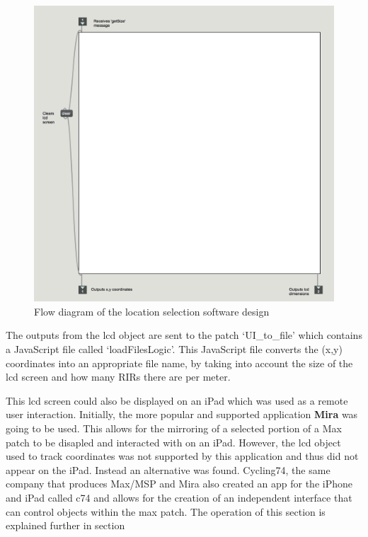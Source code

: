 \documentclass[../../main.tex]{subfiles}
\begin{document}
			\begin{figure}[H]
				\centerline{\includegraphics[scale = 0.4]{Sections/Implementation/Max/images/Max/lcd.png}}
				\caption{Flow diagram of the location selection software design}
				\label{lcd}
			\end{figure}

			The outputs from the lcd object are sent to the patch ‘UI\_to\_file’ which contains a JavaScript file called ‘loadFilesLogic’. This JavaScript file converts the (x,y) coordinates into an appropriate file name, by taking into account the size of the lcd screen and how many RIRs there are per meter.

			This lcd screen could also be displayed on an iPad which was used as a remote user interaction. Initially, the more popular and supported application \textbf{Mira} \cite{mira} was going to be used. This allows for the mirroring of a selected portion of a Max patch to be disapled and interacted with on an iPad. However, the lcd object used to track coordinates was not supported by this application and thus did not appear on the iPad. Instead an alternative was found. Cycling74, the same company that produces Max/MSP and Mira also created an app for the iPhone and iPad called c74 \cite{c74} and allows for the creation of an independent interface that can control objects within the max patch. The operation of this section is explained further in section 
\end{document}
